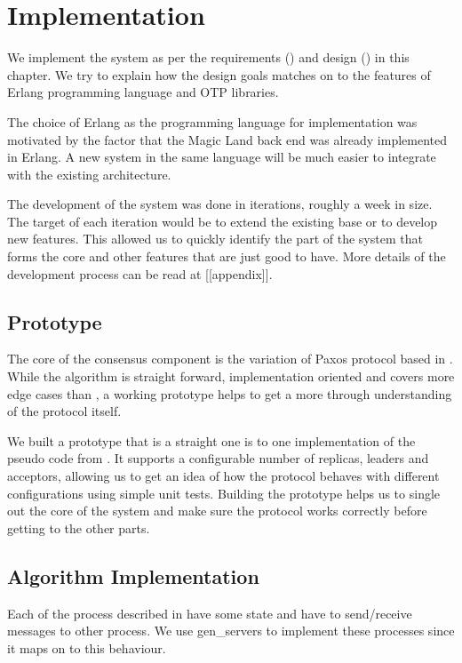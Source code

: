\chapter{Implementation}
\label{chapter:implementation}

We implement the system as per the requirements () and
design () in this chapter. We try to explain how the
design goals matches on to the features of Erlang \citep{erlang} programming
language and OTP libraries.

The choice of Erlang as the programming language for implementation was
motivated by the factor that the Magic Land back end was already implemented in
Erlang. A new system in the same language will be much easier to integrate with
the existing architecture.

The development of the system was done in iterations, roughly a week in size.
The target of each iteration would be to extend the existing base or to develop
new features. This allowed us to quickly identify the part of the system that
forms the core and other features that are just good to have. More details of
the development process can be read at [[appendix]].

\section{Prototype}

The core of the consensus component is the variation of Paxos protocol based
in \citet{Robbert2011}. While the algorithm is straight forward, implementation
oriented and covers more edge cases than \citet{Lamport01}, a working prototype
helps to get a more through understanding of the protocol itself.

We built a prototype that is a straight one is to one implementation of the
pseudo code from \citet{Robbert2011}. It supports a configurable number of
replicas, leaders and acceptors, allowing us to get an idea of how the protocol
behaves with different configurations using simple unit tests. Building the
prototype helps us to single out the core of the system and make sure the
protocol works correctly before getting to the other parts.

\section{Algorithm Implementation}

Each of the process described in  have some state
and have to send/receive messages to other process. We use gen\_servers
 to implement these processes since it maps on to
this behaviour.


